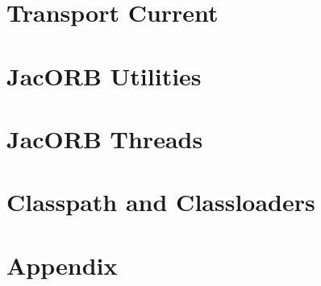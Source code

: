 \documentclass[12pt]{scrbook}
\begin{document}





\chapter{Transport Current}
\label{ch:transportcurrent}






\chapter{JacORB Utilities}
\label{ch:tools}





\chapter{JacORB Threads}
\label{ch:threads}






\chapter{Classpath and Classloaders}
\label{ch:classloader}






\chapter{Appendix}




{


}
\end{document}
